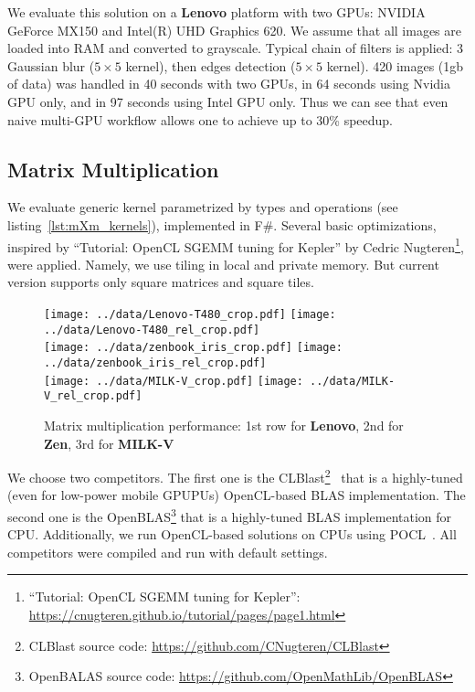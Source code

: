 We evaluate this solution on a \textbf{Lenovo} platform with two GPUs: NVIDIA GeForce MX150 and Intel(R) UHD Graphics 620.
We assume that all images are loaded into RAM and converted to grayscale. 
Typical chain of filters is applied: 3 Gaussian blur ($5 \times 5$ kernel), then edges detection ($5 \times 5$ kernel).
420 images (1gb of data) was handled in 40 seconds with two GPUs, in 64 seconds using Nvidia GPU only, and in 97 seconds using Intel GPU only.
Thus we can see that even naive multi-GPU workflow allows one to achieve up to 30\% speedup.

\subsection{Matrix Multiplication}

We evaluate generic kernel parametrized by types and operations (see listing~\ref{lst:mXm_kernels}), implemented in F\#.
Several basic optimizations, inspired by ``Tutorial: OpenCL SGEMM tuning for Kepler'' by Cedric Nugteren\footnote{``Tutorial: OpenCL SGEMM tuning for Kepler'': \url{https://cnugteren.github.io/tutorial/pages/page1.html}}, were applied.
Namely, we use tiling in local and private memory.
But current version supports only square matrices and square tiles.

\begin{figure}
  \begin{center}
  \texttt{[image: ../data/Lenovo-T480\_crop.pdf]}
  \texttt{[image: ../data/Lenovo-T480\_rel\_crop.pdf]}\\
  \texttt{[image: ../data/zenbook\_iris\_crop.pdf]}
  \texttt{[image: ../data/zenbook\_iris\_rel\_crop.pdf]}\\
  \texttt{[image: ../data/MILK-V\_crop.pdf]}
  \texttt{[image: ../data/MILK-V\_rel\_crop.pdf]}
  \end{center}
  \caption{Matrix multiplication performance: 1st row for \textbf{Lenovo}, 2nd for \textbf{Zen}, 3rd for \textbf{MILK-V}}
  \label{fig:mxm_perf}
\end{figure}

We choose two competitors.
The first one is the CLBlast\footnote{CLBlast source code: \url{https://github.com/CNugteren/CLBlast}}~\cite{10.1145/3204919.3204924} that is a highly-tuned (even for low-power mobile GPUPUs) OpenCL-based BLAS implementation.
The second one is the OpenBLAS\footnote{OpenBALAS source code: \url{https://github.com/OpenMathLib/OpenBLAS}} that is a highly-tuned BLAS implementation for CPU.
Additionally, we run OpenCL-based solutions on CPUs using POCL~\cite{Jskelinen2014}.
All competitors were compiled and run with default settings.


